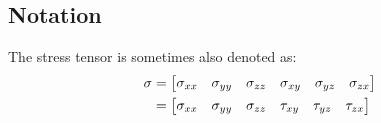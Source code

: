 \documentclass[11pt, a4paper]{article}
\numberwithin{equation}{section}
\numberwithin{figure}{section}
\begin{document}
\subsection{Notation}
The stress tensor is sometimes also denoted as:
\begin{align}
  \mathbf{\sigma} &= 
  \begin{bmatrix}
  \sigma_{xx} &  \sigma_{yy} &  \sigma_{zz} &  \sigma_{xy} &  \sigma_{yz} &  \sigma_{zx}
  \end{bmatrix} \notag \\
  &=
  \begin{bmatrix}
    \sigma_{xx} &  \sigma_{yy} &  \sigma_{zz} &  \tau_{xy} &  \tau_{yz} &  \tau_{zx}
    \end{bmatrix}
\end{align}
\end{document}

